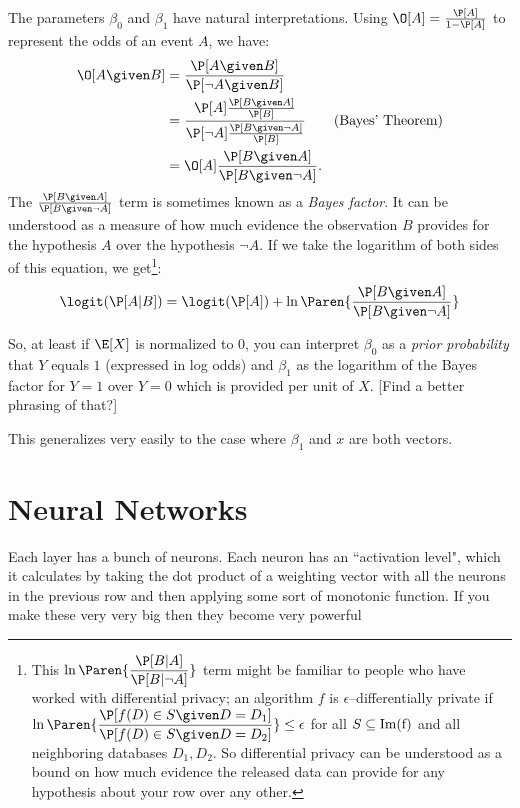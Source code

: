 The parameters $\beta_0$ and $\beta_1$ have natural interpretations. Using $\O[A] = \frac{\P[A]}{1-\P[A]}$ to represent the odds of an event $A$, we have:
\begin{align*}
    \O[A \given B] &= \dfrac{\P[A \given B]}{\P[\lnot A \given B]}\\
    &= \dfrac{\P[A]\frac{\P[B \given A]}{\P[B]}}{\P[\lnot A] \frac{\P[B \given \lnot A]}{\P[B]}} \tag{Bayes' Theorem}\\
    &= \O[A] \dfrac{\P[B \given A]}{\P[B \given \lnot A]}.
\end{align*}
The $\frac{\P[B\given A]}{\P[B \given \lnot A]}$ term is sometimes known as a \textit{Bayes factor}. It can be understood as a measure of how much evidence the observation $B$ provides for the hypothesis $A$ over the hypothesis $\lnot A$. If we take the logarithm of both sides of this equation, we get\footnote{This $\ln\Paren{\dfrac{\P[B | A]}{\P[B | \lnot A]}}$ term might be familiar to people who have worked with differential privacy; an algorithm $f$ is $\epsilon$–differentially private if $\ln\Paren{\dfrac{\P[f(D) \in S \given D = D_1]}{\P[f(D) \in S \given D = D_2]}} \leq \epsilon$ for all $S \subseteq \rm{Im}(f)$ and all neighboring databases $D_1, D_2$. So differential privacy can be understood as a bound on how much evidence the released data can provide for any hypothesis about your row over any other.}:
\begin{equation}
    \logit(\P[A|B]) = \logit(\P[A]) + \ln\Paren{\dfrac{\P[B \given A]}{\P[B \given \lnot A]}}
\end{equation}

So, at least if $\E[X]$ is normalized to $0$, you can interpret $\beta_0$ as a \textit{prior probability} that $Y$ equals $1$ (expressed in log odds) and $\beta_1$ as the logarithm of the Bayes factor for $Y=1$ over $Y=0$ which is provided per unit of $X$. [Find a better phrasing of that?]

This generalizes very easily to the case where $\beta_1$ and $x$ are both vectors. 

\section{Neural Networks}
Each layer has a bunch of neurons. Each neuron has an ``activation level", which it calculates by taking the dot product of a weighting vector with all the neurons in the previous row and then applying some sort of monotonic function. If you make these very very big then they become very powerful

